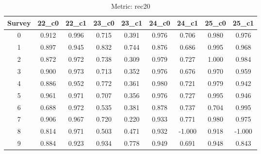 \documentclass{article}
\begin{document}
\begin{table}[tbh]
\begin{center}
\begin{tabular}{|*{9}{c|}}
\hline
 Survey & 22\_c0 & 22\_c1 & 23\_c0 & 23\_c1 & 24\_c0 & 24\_c1 & 25\_c0 & 25\_c1 \\ 
\hline
0 & 0.912 & 0.996 & 0.715 & 0.391 & 0.976 & 0.706 & 0.980 & 0.976 \\ 
1 & 0.897 & 0.945 & 0.832 & 0.744 & 0.876 & 0.686 & 0.995 & 0.968 \\ 
2 & 0.872 & 0.972 & 0.738 & 0.309 & 0.979 & 0.727 & 1.000 & 0.984 \\ 
3 & 0.900 & 0.973 & 0.713 & 0.352 & 0.976 & 0.676 & 0.970 & 0.959 \\ 
4 & 0.886 & 0.952 & 0.772 & 0.361 & 0.980 & 0.721 & 0.979 & 0.942 \\ 
5 & 0.961 & 0.971 & 0.707 & 0.356 & 0.976 & 0.727 & 0.995 & 0.946 \\ 
6 & 0.688 & 0.972 & 0.535 & 0.381 & 0.878 & 0.737 & 0.704 & 0.995 \\ 
7 & 0.906 & 0.967 & 0.720 & 0.220 & 0.933 & 0.771 & 0.980 & 0.975 \\ 
8 & 0.814 & 0.971 & 0.503 & 0.471 & 0.932 & -1.000 & 0.918 & -1.000 \\ 
9 & 0.884 & 0.923 & 0.934 & 0.778 & 0.949 & 0.691 & 0.948 & 0.843 \\ 
\hline
\end{tabular}
\end{center}
\caption{Metric: rec20}
\end{table}
\end{document}

